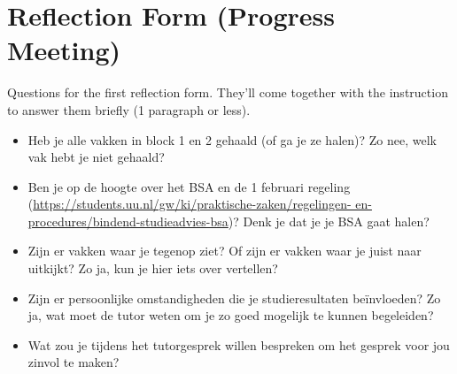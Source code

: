 \chapter{Reflection Form (Progress Meeting)}

Questions for the first reflection form.
They'll come together with the instruction to answer them briefly (1 paragraph or less).

\begin{itemize}

	\item Heb je alle vakken in block 1 en 2 gehaald (of ga je ze halen)? Zo nee, welk vak hebt je niet gehaald?

	\item Ben je op de hoogte over het BSA en de 1 februari regeling (\url{https://students.uu.nl/gw/ki/praktische-zaken/regelingen- en-procedures/bindend-studieadvies-bsa})?
          Denk je dat je je BSA gaat halen?

	\item Zijn er vakken waar je tegenop ziet?
          Of zijn er vakken waar je juist naar uitkijkt?
          Zo ja, kun je hier iets over vertellen?

	\item Zijn er persoonlijke omstandigheden die je studieresultaten be\"invloeden?
          Zo ja, wat moet de tutor weten om je zo goed mogelijk te kunnen begeleiden?

	\item Wat zou je tijdens het tutorgesprek willen bespreken om het gesprek voor jou zinvol te maken?

\end{itemize}

